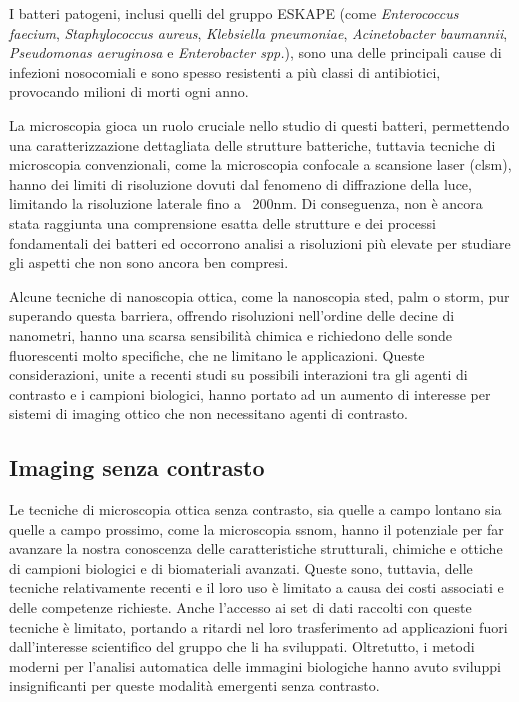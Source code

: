 \documentclass[../main.tex]{subfiles}
\begin{document}
I batteri patogeni, inclusi quelli del gruppo ESKAPE (come \textit{Enterococcus faecium}, \textit{Staphylococcus aureus}, \textit{Klebsiella pneumoniae}, \textit{Acinetobacter baumannii}, \textit{Pseudomonas aeruginosa} e \textit{Enterobacter spp.}), sono una delle principali cause di infezioni nosocomiali e sono spesso resistenti a più classi di antibiotici, provocando milioni di morti ogni anno.\cite{tacconelli_2018,rice_2010,pendleton_2013}

La microscopia gioca un ruolo cruciale nello studio di questi batteri, permettendo una caratterizzazione dettagliata delle strutture batteriche, tuttavia tecniche di microscopia convenzionali, come la microscopia confocale a scansione laser (\acrshort{clsm}), hanno dei limiti di risoluzione dovuti dal fenomeno di diffrazione della luce, limitando la risoluzione laterale fino a ~200nm.
Di conseguenza, non è ancora stata raggiunta una comprensione esatta delle strutture e dei processi fondamentali dei batteri ed occorrono analisi a risoluzioni più elevate per studiare gli aspetti che non sono ancora ben compresi.

Alcune tecniche di nanoscopia ottica, come la nanoscopia \acrshort{sted}, \acrshort{palm} o \acrshort{storm}, pur superando questa barriera, offrendo risoluzioni nell'ordine delle decine di nanometri, hanno una scarsa sensibilità chimica e richiedono delle sonde fluorescenti molto specifiche, che ne limitano le applicazioni.
Queste considerazioni, unite a recenti studi su possibili interazioni tra gli agenti di contrasto e i campioni biologici\cite{cosentino_2019}, hanno portato ad un aumento di interesse per sistemi di imaging ottico che non necessitano agenti di contrasto.

\subsection{Imaging senza contrasto}

Le tecniche di microscopia ottica senza contrasto, sia quelle a campo lontano sia quelle a campo prossimo, come la microscopia \acrshort{ssnom}, hanno il potenziale per far avanzare la nostra  conoscenza delle caratteristiche strutturali, chimiche e ottiche di campioni biologici e di biomateriali avanzati. Queste sono, tuttavia, delle tecniche relativamente recenti e il loro uso è limitato a causa dei costi associati e delle competenze richieste.
Anche l'accesso ai set di dati raccolti con queste tecniche è limitato, portando a ritardi nel loro trasferimento ad applicazioni fuori dall'interesse scientifico del gruppo che li ha sviluppati. Oltretutto, i metodi moderni per l'analisi automatica delle immagini biologiche hanno avuto sviluppi insignificanti per queste modalità emergenti senza contrasto.
\end{document}
